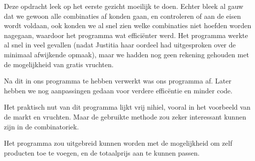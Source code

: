 Deze opdracht leek op het eerste gezicht moeilijk te doen. Echter bleek al gauw dat we gewoon alle combinaties af konden gaan, en controleren of aan de eisen wordt voldaan, ook konden we al snel zien welke combinaties niet hoefden worden nagegaan, waardoor het programma wat effici\"enter werd. Het programma werkte al snel in veel gevallen (nadat Justitia haar oordeel had uitgesproken over de minimaal afwijkende opmaak), maar we hadden nog geen rekening gehouden met de mogelijkheid van gratis vruchten.

Na dit in ons programma te hebben verwerkt was ons programma af. Later hebben we nog aanpassingen gedaan voor verdere effic\"entie en minder code.

Het praktisch nut van dit programma lijkt vrij nihiel, vooral in het voorbeeld van de markt en vruchten. Maar de gebruikte methode zou zeker interessant kunnen zijn in de combinatoriek.

Het programma zou uitgebreid kunnen worden met de mogelijkheid om zelf producten toe te voegen, en de totaalprijs aan te kunnen passen.